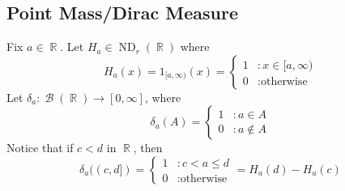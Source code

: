 \documentclass[11pt, a4paper]{memoir}
\DeclareMathOperator{\R}{{\mathbb{R}}}
\theoremstyle{change}
\theoremstyle{plain}
\theoremstyle{nonumberplain}
\DeclareMathOperator{\B}{{\mathcal{B}}}
\DeclareMathOperator{\ND}{ND}
\begin{document}
\subsection{Point Mass/Dirac Measure}
Fix $a\in\R$.
Let $H_a\in\ND_r(\R)$ where
\begin{equation*}
    H_a(x)=1_{[a,\infty)}(x)=\begin{cases}1&:x\in[a,\infty)\\0&:\text{otherwise}\end{cases}
\end{equation*}
Let $\delta_a:\B(\R)\to[0,\infty]$, where
\begin{equation*}
    \delta_a(A)=\begin{cases}1&:a\in A\\0&:a\notin A\end{cases}
\end{equation*}
Notice that if $c<d$ in $\R$, then
\begin{equation*}
    \delta_a((c,d])=\begin{cases}1 &:c<a\leq d\\0&:\text{otherwise}\end{cases}=H_a(d)-H_a(c) %
\end{equation*}
\end{document}
